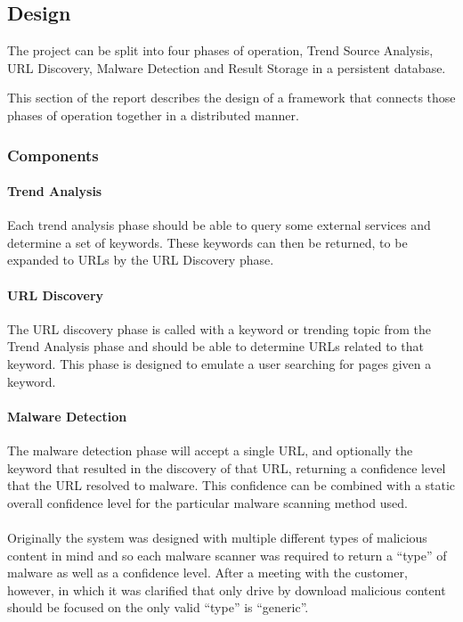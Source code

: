 \subsection{Design}
The project can be split into four phases of operation, Trend Source Analysis, URL Discovery, Malware Detection and Result Storage in a persistent database.

This section of the report describes the design of a framework that connects those phases of operation together in a distributed manner.

\subsubsection{Components}
\paragraph{Trend Analysis}
Each trend analysis phase should be able to query some external services and determine a set of keywords. These keywords can then be returned, to be expanded to URLs by the URL Discovery phase.

\paragraph{URL Discovery}
The URL discovery phase is called with a keyword or trending topic from the Trend Analysis phase and should be able to determine URLs related to that keyword. This phase is designed to emulate a user searching for pages given a keyword.

\paragraph{Malware Detection}
The malware detection phase will accept a single URL, and optionally the keyword that resulted in the discovery of that URL, returning a confidence level that the URL resolved to malware.  This confidence can be combined with a static overall confidence level for the particular malware scanning method used.

\paragraph{}
Originally the system was designed with multiple different types of malicious content in mind and so each malware scanner was required to return a ``type'' of malware as well as a confidence level. After a meeting with the customer, however, in which it was clarified that only drive by download malicious content should be focused on the only valid ``type'' is ``generic''.

